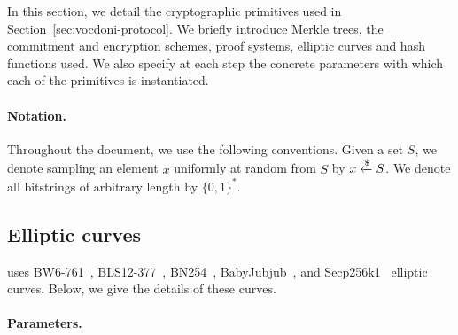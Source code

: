 
In this section, we detail the cryptographic primitives used in Section~\ref{sec:vocdoni-protocol}. We briefly introduce Merkle trees, the commitment and encryption schemes, proof systems, elliptic curves and hash functions used. We also specify at each step the concrete parameters with which each of the primitives is instantiated.\\


\paragraph{Notation.} Throughout the document, we use the following conventions. Given a set $S$, we denote sampling an element $x$ uniformly at random from $S$ by $x \xleftarrow{\$} S$. We denote all bitstrings of arbitrary length by $\{0,1\}^*$. 

\subsection{Elliptic curves}
\label{sec:cryptographic-primitives:elliptic-curves}


\davinci uses BW6-761~\cite{elhousni20optimized}, BLS12-377~\cite{bowe20zexe}, BN254~\cite{jancar20bn256}, BabyJubjub~\cite{belles21twisted}, and Secp256k1~\cite{brown10sec} elliptic curves. Below, we give the details of these curves.

\paragraph{Parameters.}


